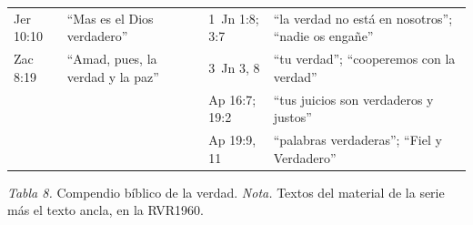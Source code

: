 \begin{center}
\begin{tabular}{@{}L{2.2cm}L{5.0cm}|L{2.2cm}L{5.0cm}@{}}
Jer 10:10 & ``Mas \SENOR{} es el Dios verdadero'' & 1~Jn 1:8; 3:7 & ``la verdad no está en nosotros''; ``nadie os engañe'' \\
Zac 8:19 & ``Amad, pues, la verdad y la paz'' & 3~Jn 3, 8 & ``tu verdad''; ``cooperemos con la verdad'' \\
 & & Ap 16:7; 19:2 & ``tus juicios son verdaderos y justos'' \\
 & & Ap 19:9, 11 & ``palabras verdaderas''; ``Fiel y Verdadero'' \\
\bottomrule
\end{tabular}\par
{\footnotesize\color{gris}\textit{Tabla 8.} Compendio bíblico de la verdad. \textit{Nota.} Textos del material de la serie más el texto ancla, en la RVR1960.}
\end{center}

